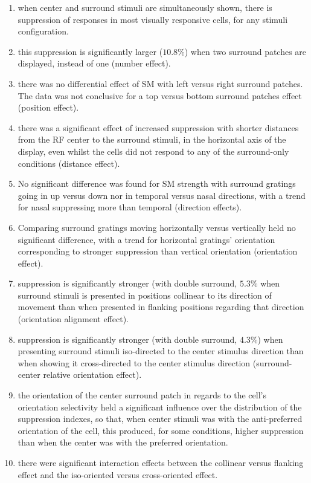 \begin{enumerate}
\item when center and surround stimuli are simultaneously shown, there is suppression of responses in most visually responsive cells, for any stimuli configuration.
\item this suppression is significantly larger ($10.8\%$) when two surround patches are displayed, instead of one (number effect).
\item there was no differential effect of SM with left versus right surround patches. The data was not conclusive for a top versus bottom surround patches effect (position effect).
\item there was a significant effect of increased suppression with shorter distances from the RF center to the surround stimuli, in the horizontal axis of the display, even whilst the cells did not respond to any of the surround-only conditions (distance effect).
\item No significant difference was found for SM strength with surround gratings going in up versus down nor in temporal versus nasal directions, with a trend for nasal suppressing more than temporal (direction effects).
\item Comparing surround gratings moving horizontally versus vertically held no significant difference, with a trend for horizontal gratings' orientation corresponding to stronger suppression than vertical orientation (orientation effect).
\item suppression is significantly stronger (with double surround, $5.3\%$ when surround stimuli is presented in positions collinear to its direction of movement than when presented in flanking positions regarding that direction (orientation alignment effect).
\item suppression is significantly stronger (with double surround, $4.3\%$) when presenting surround stimuli iso-directed to the center stimulus direction than when showing it cross-directed to the center stimulus direction (surround-center relative orientation effect).
\item the orientation of the center surround patch in regards to the cell's orientation selectivity held a significant influence over the distribution of the suppression indexes, so that, when center stimuli was with the anti-preferred orientation of the cell, this produced, for some conditions, higher suppression than when the center was with the preferred orientation. 
\item there were significant interaction effects between the collinear versus flanking effect and the iso-oriented versus cross-oriented effect.
\end{enumerate}

